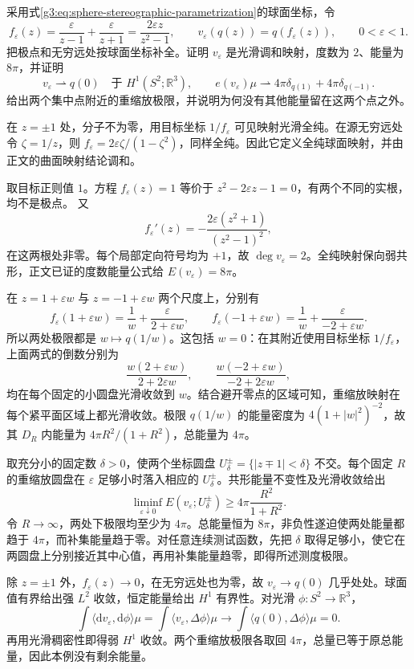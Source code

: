 \begin{exercise}\label{g3:ex:two-sphere-bubbles}
	采用式\eqref{g3:eq:sphere-stereographic-parametrization}的球面坐标，令
	\[
		f_\varepsilon(z)=\frac{\varepsilon}{z-1}
		+\frac{\varepsilon}{z+1}
		=\frac{2\varepsilon z}{z^2-1},\qquad
		v_\varepsilon(q(z))=q(f_\varepsilon(z)),
		\qquad 0<\varepsilon<1.
	\]
	把极点和无穷远处按球面坐标补全。证明 \(v_\varepsilon\) 是光滑调和映射，度数为 \(2\)、能量为 \(8\pi\)，并证明
	\[
		v_\varepsilon\rightharpoonup q(0)
		\quad\text{于 }H^1(S^2;\mathbb R^3),\qquad
		e(v_\varepsilon)\mu
		\rightharpoonup4\pi\delta_{q(1)}+4\pi\delta_{q(-1)}.
	\]
	给出两个集中点附近的重缩放极限，并说明为何没有其他能量留在这两个点之外。
\end{exercise}
\begin{solution}
	在 \(z=\pm1\) 处，分子不为零，用目标坐标 \(1/f_\varepsilon\) 可见映射光滑全纯。在源无穷远处令 \(\zeta=1/z\)，则
	\(f_\varepsilon=2\varepsilon\zeta/(1-\zeta^2)\)，同样全纯。因此它定义全纯球面映射，并由正文的曲面映射结论调和。

	取目标正则值 \(1\)。方程 \(f_\varepsilon(z)=1\) 等价于
	\(z^2-2\varepsilon z-1=0\)，有两个不同的实根，均不是极点。
	又
	\[
		f_\varepsilon'(z)
		=-\frac{2\varepsilon(z^2+1)}{(z^2-1)^2},
	\]
	在这两根处非零。每个局部定向符号均为 \(+1\)，故
	\(\deg v_\varepsilon=2\)。全纯映射保向弱共形，正文已证的度数能量公式给
	\(E(v_\varepsilon)=8\pi\)。

	在 \(z=1+\varepsilon w\) 与 \(z=-1+\varepsilon w\) 两个尺度上，分别有
	\[
		f_\varepsilon(1+\varepsilon w)
		=\frac1w+\frac{\varepsilon}{2+\varepsilon w},
		\qquad
		f_\varepsilon(-1+\varepsilon w)
		=\frac1w+\frac{\varepsilon}{-2+\varepsilon w}.
	\]
	所以两处极限都是 \(w\mapsto q(1/w)\)。这包括 \(w=0\)：在其附近使用目标坐标 \(1/f_\varepsilon\)，上面两式的倒数分别为
	\[
		\frac{w(2+\varepsilon w)}{2+2\varepsilon w},
		\qquad
		\frac{w(-2+\varepsilon w)}{-2+2\varepsilon w},
	\]
	均在每个固定的小圆盘光滑收敛到 \(w\)。结合避开零点的区域可知，重缩放映射在每个紧平面区域上都光滑收敛。极限 \(q(1/w)\) 的能量密度为
	\(4(1+|w|^2)^{-2}\)，故其 \(D_R\) 内能量为
	\(4\pi R^2/(1+R^2)\)，总能量为 \(4\pi\)。

	取充分小的固定数 \(\delta>0\)，使两个坐标圆盘
	\(U_\delta^\pm=\{|z\mp1|<\delta\}\) 不交。每个固定 \(R\) 的重缩放圆盘在 \(\varepsilon\) 足够小时落入相应的 \(U_\delta^\pm\)。共形能量不变性及光滑收敛给出
	\[
		\liminf_{\varepsilon\downarrow0}E(v_\varepsilon;U_\delta^\pm)
		\ge4\pi\frac{R^2}{1+R^2}.
	\]
	令 \(R\to\infty\)，两处下极限均至少为 \(4\pi\)。总能量恒为
	\(8\pi\)，非负性遂迫使两处能量都趋于 \(4\pi\)，而补集能量趋于零。对任意连续测试函数，先把 \(\delta\) 取得足够小，使它在两圆盘上分别接近其中心值，再用补集能量趋零，即得所述测度极限。

	除 \(z=\pm1\) 外，\(f_\varepsilon(z)\to0\)，在无穷远处也为零，故
	\(v_\varepsilon\to q(0)\) 几乎处处。球面值有界给出强 \(L^2\) 收敛，恒定能量给出 \(H^1\) 有界性。对光滑 \(\phi:S^2\to\mathbb R^3\)，
	\[
		\int\langle\mathrm dv_\varepsilon,\mathrm d\phi\rangle\mu
		=\int\langle v_\varepsilon,\Delta\phi\rangle\mu
		\longrightarrow\int\langle q(0),\Delta\phi\rangle\mu=0.
	\]
	再用光滑稠密性即得弱 \(H^1\) 收敛。两个重缩放极限各取回 \(4\pi\)，总量已等于原总能量，因此本例没有剩余能量。
\end{solution}

